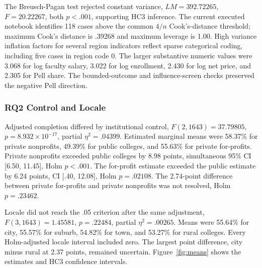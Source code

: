 \documentclass[12pt,a4paper]{article}
\begin{document}
The Breusch-Pagan test rejected constant variance, $LM=392.72265$, $F=20.22267$, both $p<.001$, supporting HC3 inference. The current executed notebook identifies 118 cases above the common $4/n$ Cook's-distance threshold; maximum Cook's distance is .39268 and maximum leverage is 1.00. High variance inflation factors for several region indicators reflect sparse categorical coding, including five cases in region code 0. The larger substantive numeric values were 3.068 for log faculty salary, 3.022 for log enrollment, 2.430 for log net price, and 2.305 for Pell share. The bounded-outcome and influence-screen checks preserved the negative Pell direction.

\subsubsection{RQ2 Control and Locale}

Adjusted completion differed by institutional control, $F(2,1643)=37.79805$, $p=8.932\times10^{-17}$, partial $\eta^2=.04399$. Estimated marginal means were 58.37\% for private nonprofits, 49.39\% for public colleges, and 55.63\% for private for-profits. Private nonprofits exceeded public colleges by 8.98 points, simultaneous 95\% CI [6.50, 11.45], Holm $p<.001$. The for-profit estimate exceeded the public estimate by 6.24 points, CI [.40, 12.08], Holm $p=.02108$. The 2.74-point difference between private for-profits and private nonprofits was not resolved, Holm $p=.23462$.

Locale did not reach the .05 criterion after the same adjustment, $F(3,1643)=1.45581$, $p=.22484$, partial $\eta^2=.00265$. Means were 55.64\% for city, 55.57\% for suburb, 54.82\% for town, and 53.27\% for rural colleges. Every Holm-adjusted locale interval included zero. The largest point difference, city minus rural at 2.37 points, remained uncertain. Figure~\ref{fig:means} shows the estimates and HC3 confidence intervals.
\end{document}
